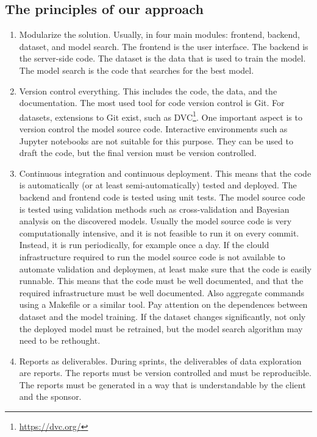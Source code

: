 \subsection{The principles of our approach}

\begin{enumerate}
  \item Modularize the solution. Usually, in four main modules: frontend, backend,
    dataset, and model search.  The frontend is the user interface.  The backend is the
    server-side code.  The dataset is the data that is used to train the model.  The model
    search is the code that searches for the best model.
  \item Version control everything.  This includes the code, the data, and the
    documentation. The most used tool for code version control is Git.  For datasets,
    extensions to Git exist, such as DVC\footnote{\url{https://dvc.org/}}.  One important aspect
    is to version control the model source code.  Interactive environments such as Jupyter
    notebooks are not suitable for this purpose.  They can be used to draft the code, but
    the final version must be version controlled.
  \item Continuous integration and continuous deployment.  This means that the code is
    automatically (or at least semi-automatically) tested and deployed.  The backend and
    frontend code is tested using unit tests.  The model source code is tested using
    validation methods such as cross-validation and Bayesian analysis on the discovered
    models.  Usually the model source code is very computationally intensive, and it is
    not feasible to run it on every commit.  Instead, it is run periodically, for example
    once a day.  If the clould infrastructure required to run the model source code is not
    available to automate validation and deploymen, at least make sure that the code is
    easily runnable.  This means that the code must be well documented, and that the
    required infrastructure must be well documented.  Also aggregate commands using a
    Makefile or a similar tool.  Pay attention on the dependences between dataset and the
    model training.  If the dataset changes significantly, not only the deployed model
    must be retrained, but the model search algorithm may need to be rethought.
  \item Reports as deliverables.  During sprints, the deliverables of data exploration are
    reports.  The reports must be version controlled and must be reproducible.  The reports
    must be generated in a way that is understandable by the client and the sponsor.

\end{enumerate}
